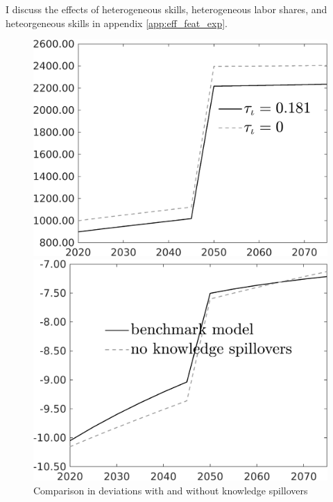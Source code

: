I discuss the effects of heterogeneous skills, heterogeneous labor shares, and heteorgeneous skills in appendix \ref{app:eff_feat_exp}. 
 \begin{figure}[h!!]
	\centering
	\caption{Comparison in deviations with and without knowledge spillovers}\label{fig:Limit_nsk0_xgr0_know_Devs}
		\begin{minipage}[]{0.32\textwidth}
		\includegraphics[width=1\textwidth]{../../codding_model/own_basedOnFried/optimalPol_010922_revision/figures/all_13Sept22/CompTauf_bytaul_Reg0_Tauf_spillover0_nsk0_xgr0_knspil1_sep0_LFlimit1_emsbase0_countec0_GovRev0_etaa0.79_lgd1.png}
	\end{minipage}	
\begin{minipage}[]{0.32\textwidth}
		\includegraphics[width=1\textwidth]{../../codding_model/own_basedOnFried/optimalPol_010922_revision/figures/all_13Sept22/CompTaufPER_bytaul_KN_Reg0_Tauf_spillover0_nsk0_xgr0_knspil0_sep0_LFlimit1_emsbase0_countec0_GovRev0_etaa0.79_lgd1.png} 

\end{minipage}
\end{figure}
